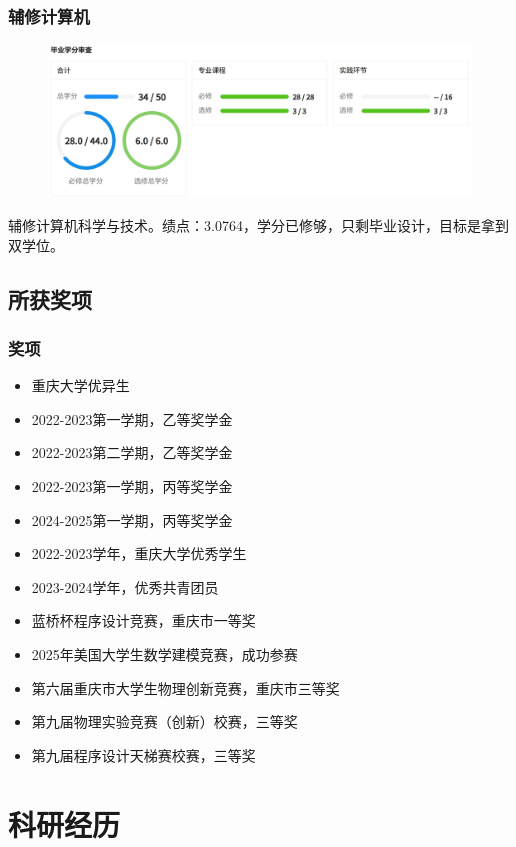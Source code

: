 \documentclass[12pt,aspectratio=169,UTF8]{beamer}
\begin{document}
\begin{frame}
  \frametitle{辅修计算机}
 \begin{figure}[ht]
    \centering
    \includegraphics[width =.6\textwidth]{cs.jpeg}
    \label{fig:cs}
\end{figure}
辅修计算机科学与技术。绩点：3.0764，学分已修够，只剩毕业设计，目标是拿到双学位。
\end{frame}

\subsection{所获奖项}
\begin{frame}
  \frametitle{奖项}

  \begin{itemize}
   \item  重庆大学优异生
   \item   2022-2023第一学期，乙等奖学金
   \item   2022-2023第二学期，乙等奖学金
   \item   2022-2023第一学期，丙等奖学金
   \item   2024-2025第一学期，丙等奖学金
   \item   2022-2023学年，重庆大学优秀学生
   \item   2023-2024学年，优秀共青团员
   \item   蓝桥杯程序设计竞赛，重庆市一等奖
   \item   2025年美国大学生数学建模竞赛，成功参赛
   \item   第六届重庆市大学生物理创新竞赛，重庆市三等奖
   \item   第九届物理实验竞赛（创新）校赛，三等奖
   \item   第九届程序设计天梯赛校赛，三等奖
  \end{itemize}
\end{frame}

\section{科研经历}
\end{document}
